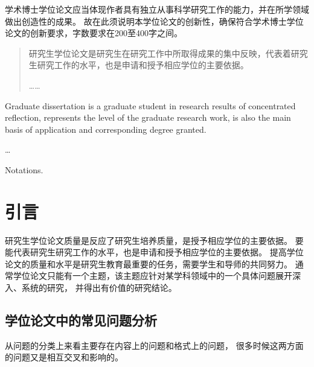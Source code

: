\frontmatter
\begin{innovations}
  学术博士学位论文应当体现作者具有独立从事科学研究工作的能力，并在所学领域做出创造性的成果。
  故在此须说明本学位论文的创新性，确保符合学术博士学位论文的创新要求，字数要求在200至400字之间。
\end{innovations}


\begin{abstract}
  研究生学位论文是研究生在研究工作中所取得成果的集中反映，代表着研究生研究工作的水平，也是申请和授予相应学位的主要依据。\par
  ……
\end{abstract}

\begin{abstract*}
  Graduate dissertation is a graduate student in research results of concentrated reflection, represents the level of the graduate research work, is also the main basis of application and corresponding degree granted.\par
  \dots
\end{abstract*}

\tableofcontents

\listoffiguresandtables

\begin{notation}
  Notations.
\end{notation}

\mainmatter

\chapter{引言}

研究生学位论文质量是反应了研究生培养质量，是授予相应学位的主要依据。
要能代表研究生研究工作的水平，也是申请和授予相应学位的主要依据。
提高学位论文的质量和水平是研究生教育最重要的任务，需要学生和导师的共同努力。
通常学位论文只能有一个主题，该主题应针对某学科领域中的一个具体问题展开深入、系统的研究，
并得出有价值的研究结论。

\section{学位论文中的常见问题分析}

从问题的分类上来看主要存在内容上的问题和格式上的问题，
很多时候这两方面的问题又是相互交叉和影响的。

